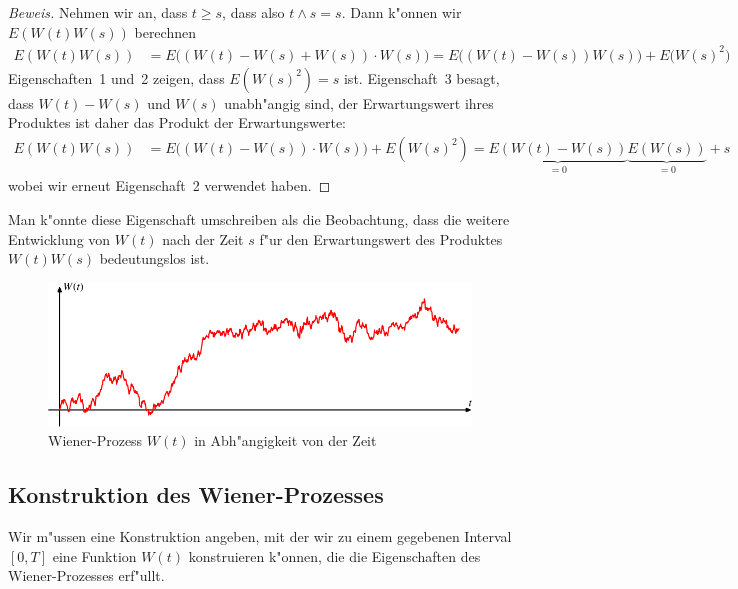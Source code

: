 \begin{proof}[Beweis]
Nehmen wir an, dass $t\ge s$, dass also $t\wedge s = s$.
Dann k"onnen wir $E(W(t)W(s))$ berechnen
\begin{align*}
E(W(t)W(s))
&=
E\bigl((W(t)-W(s)+W(s))\cdot W(s)\bigr)
=
E\bigl((W(t)-W(s))W(s))+E(W(s)^2\bigr)
\end{align*}
Eigenschaften~1 und~2 zeigen, dass $E(W(s)^2)=s$ ist.
Eigenschaft~3 besagt, dass $W(t)-W(s)$ und $W(s)$ unabh"angig sind,
der Erwartungswert ihres Produktes ist daher das Produkt der Erwartungswerte:
\begin{align*}
E(W(t)W(s))
&=
E\bigl((W(t)-W(s))\cdot W(s)\bigr)+E(W(s)^2)
=
\underbrace{E(W(t)-W(s))}_{\textstyle =0} \underbrace{E(W(s))}_{\textstyle =0} + s
\end{align*}
wobei wir erneut Eigenschaft~2 verwendet haben.
\end{proof}
Man k"onnte diese Eigenschaft umschreiben als die Beobachtung,
dass die weitere Entwicklung von $W(t)$ nach der Zeit $s$
f"ur den Erwartungswert des Produktes $W(t)W(s)$
bedeutungslos ist.

\begin{figure}
\centering
\includegraphics{chapters/images/stochastisch-1.pdf}
\caption{Wiener-Prozess $W(t)$ in Abh"angigkeit von der Zeit
\label{stochastisch:wiener}}
\end{figure}

\subsection{Konstruktion des Wiener-Prozesses}
Wir m"ussen eine Konstruktion angeben, mit der wir zu einem gegebenen
Interval $[0,T]$ eine Funktion $W(t)$ konstruieren k"onnen, die
die Eigenschaften des Wiener-Prozesses erf"ullt.

